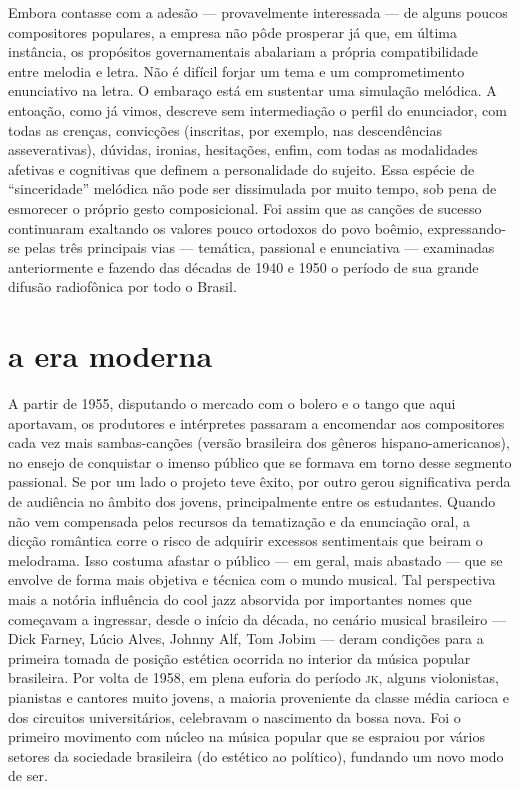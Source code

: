 Embora contasse com a adesão --- provavelmente interessada --- de alguns
poucos compositores populares, a empresa não pôde prosperar já que, em
última instância, os propósitos governamentais abalariam a própria
compatibilidade entre melodia e letra. Não é difícil forjar um tema e um
comprometimento enunciativo na letra. O embaraço está em sustentar uma
simulação melódica. A entoação, como já vimos, descreve sem
intermediação o perfil do enunciador, com todas as crenças, convicções
(inscritas, por exemplo, nas descendências asseverativas), dúvidas,
ironias, hesitações, enfim, com todas as modalidades afetivas e
cognitivas que definem a personalidade do sujeito. Essa espécie de
``sinceridade'' melódica não pode ser dissimulada por muito tempo, sob
pena de esmorecer o próprio gesto composicional. Foi assim que as
canções de sucesso continuaram exaltando os valores pouco ortodoxos do
povo boêmio, expressando-se pelas três principais vias --- temática,
passional e enunciativa --- examinadas anteriormente e fazendo das
décadas de 1940 e 1950 o período de sua grande difusão radiofônica por
todo o Brasil.

\section{a era moderna}

A partir de 1955, disputando o mercado com o bolero e o tango que aqui
aportavam, os produtores e intérpretes passaram a encomendar aos
compositores cada vez mais sambas-canções (versão brasileira dos gêneros
hispano-americanos), no ensejo de conquistar o imenso público que se
formava em torno desse segmento passional. Se por um lado o projeto teve
êxito, por outro gerou significativa perda de audiência no âmbito dos
jovens, principalmente entre os estudantes. Quando não vem compensada
pelos recursos da tematização e da enunciação oral, a dicção romântica
corre o risco de adquirir excessos sentimentais que beiram o melodrama.
Isso costuma afastar o público --- em geral, mais abastado --- que se
envolve de forma mais objetiva e técnica com o mundo musical. Tal
perspectiva mais a notória influência do cool jazz absorvida por
importantes nomes que começavam a ingressar, desde o início da década,
no cenário musical brasileiro --- Dick Farney, Lúcio Alves, Johnny Alf, Tom
Jobim --- deram condições para a primeira tomada de posição estética
ocorrida no interior da música popular brasileira. Por volta de 1958, em
plena euforia do período \textsc{jk}, alguns violonistas, pianistas e cantores
muito jovens, a maioria proveniente da classe média carioca e dos
circuitos universitários, celebravam o nascimento da bossa nova. Foi o
primeiro movimento com núcleo na música popular que se espraiou por
vários setores da sociedade brasileira (do estético ao político),
fundando um novo modo de ser.

